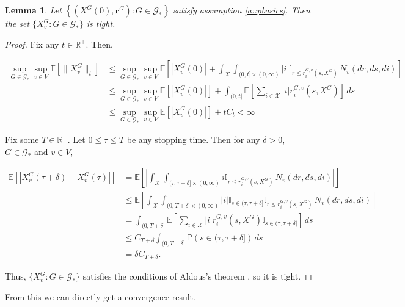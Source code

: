 \documentclass[12pt]{article}
\newcommand{\mb}{\mathbb}
\newcommand{\mc}{\mathcal}
\newcommand{\pr}{\mb{P}}							%
\newcommand{\ex}[1]{\mb{E}\left[#1\right]}			%
\newcommand{\sta}{\mc{X}}							%
\newcommand{\Xf}{X}									%
\newcommand{\poiss}{N}								%
\newcommand{\rate}{r}								%
\newcommand{\poissv}[1]{_{#1}}						%
\newcommand{\vind}[1]{_{#1}}						%
\newcommand{\tme}[1]{(#1)}							%
\newcommand{\gind}[1]{^{#1}}						%
\newcommand{\stpara}[1]{_{#1}}						%
\newcommand{\tpara}[1]{_{#1}}						%
\newcommand{\gvpara}[2]{^{#1,#2}}					%
\newcommand{\rateset}{\mathbf{\rate}}				%
\newcommand{\jumpbd}[1]{C_{#1}}						%
\newcommand{\tmepro}[2]{(#1,#2)}					%
\newcommand{\Gs}{\mc{G}_\ast}						%
\newcommand{\rt}{\tau}								%
\newtheorem{lem}[thms]{Lemma}
\begin{document}
\begin{lem}
Let \(\left\{(\Xf\gind{G}\tme{0},\rateset\gind{G}):G \in \Gs\right\}\) satisfy assumption \ref{a::pbasics}. Then the set \(\{\Xf\gind{G}\vind{v}:G \in \Gs\}\) is tight.
\label{lwc::tight}
\end{lem}
\begin{proof}
Fix any \(t \in \mb{R}^+\). Then,

\begin{align*}
\sup_{G\in \Gs}\sup_{v \in V} \ex{\|\Xf\gind{G}\vind{v}\|\tpara{t}} &\leq \sup_{G\in \Gs}\sup_{v \in V}\ex{|\Xf\gind{G}\vind{v}\tme{0}| + \int_\sta\int_{(0,t]\times(0,\infty)} |i|\mb{I}_{r \leq \rate\gvpara{G}{v}\stpara{i}\tmepro{s}{\Xf\gind{G}}}\,\poiss\poissv{v}(dr,ds,di)}\\
&\leq \sup_{G\in \Gs}\sup_{v \in V}\ex{|\Xf\gind{G}\vind{v}\tme{0}|} + \int_{(0,t]}\ex{\sum_{i\in \sta}|i|\rate\gvpara{G}{v}\stpara{i}\tmepro{s}{\Xf\gind{G}}}\,ds\\
&\leq \sup_{G\in \Gs}\sup_{v \in V}\ex{|\Xf\gind{G}\vind{v}\tme{0}|} + t\jumpbd{t} < \infty
\end{align*}

Fix some \(T \in \mb{R}^+\). Let \(0 \leq \rt \leq T\) be any stopping time. Then for any \(\delta > 0\), \(G \in \Gs\) and \(v \in V\),

\begin{align*}
\ex{\left|\Xf\gind{G}\vind{v}\tme{\rt + \delta} - \Xf\gind{G}\vind{v}\tme{\rt}\right|} &= \ex{\left|\int_\sta\int_{(\rt,\rt+\delta]\times (0,\infty)} i\mb{I}_{r \leq \rate\gvpara{G}{v}\stpara{i}\tmepro{s}{\Xf\gind{G}}}\,\poiss\poissv{v}(dr,ds,di)\right|}\\
&\leq \ex{\int_\sta\int_{(0,T+\delta]\times (0,\infty)} |i|\mb{I}_{s \in (\rt,\rt+\delta]}\mb{I}_{r \leq \rate\gvpara{G}{v}\stpara{i}\tmepro{s}{\Xf\gind{G}}}\,\poiss\poissv{v}(dr,ds,di)}\\
&= \int_{(0,T + \delta]}\ex{\sum_{i\in \sta} |i|\rate\gvpara{G}{v}\stpara{i}\tmepro{s}{\Xf\gind{G}}\mb{I}_{s \in (\rt,\rt+\delta]}}\,ds\\
&\leq \jumpbd{T+\delta}\int_{(0,T+\delta]} \pr\left(s \in (\rt,\rt+\delta]\right)\,ds\\
&= \delta\jumpbd{T + \delta}.
\end{align*}

Thus, \(\{\Xf\gind{G}\vind{v}:G \in \Gs\}\) satisfies the conditions of Aldous's theorem \cite[Theorem 16.10]{Bil99}, so it is tight.
\end{proof}

From this we can directly get a convergence result.
\end{document}
